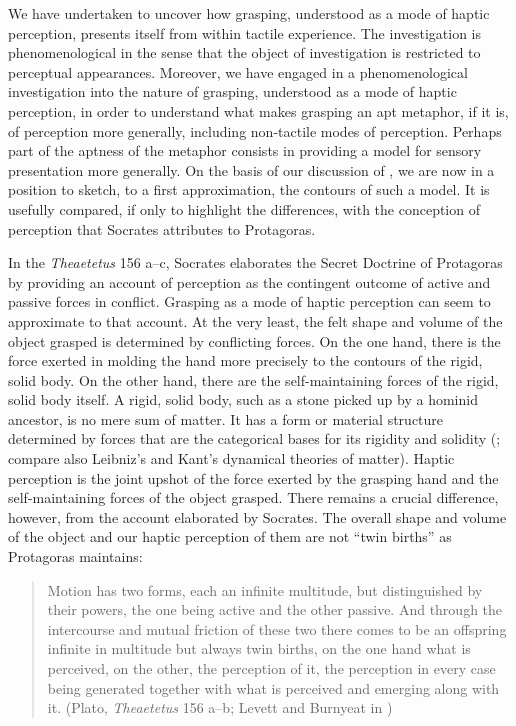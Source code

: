 We have undertaken to uncover how grasping, understood as a mode of haptic perception, presents itself from within tactile experience. The investigation is phenomenological in the sense that the object of investigation is restricted to perceptual appearances. Moreover, we have engaged in a phenomenological investigation into the nature of grasping, understood as a mode of haptic perception, in order to understand what makes grasping an apt metaphor, if it is, of perception more generally, including non-tactile modes of perception. Perhaps part of the aptness of the metaphor consists in providing a model for sensory presentation more generally. On the basis of our discussion of \citet{Lederman:1987fr}, we are now in a position to sketch, to a first approximation, the contours of such a model. It is usefully compared, if only to highlight the differences, with the conception of perception that Socrates attributes to Protagoras.

In the \emph{Theaetetus} 156 a--c, Socrates elaborates the Secret Doctrine of Protagoras by providing an account of perception as the contingent outcome of active and passive forces in conflict. Grasping as a mode of haptic perception can seem to approximate to that account. At the very least, the felt shape and volume of the object grasped is determined by conflicting forces. On the one hand, there is the force exerted in molding the hand more precisely to the contours of the rigid, solid body. On the other hand, there are the self-maintaining forces of the rigid, solid body itself. A rigid, solid body, such as a stone picked up by a hominid ancestor, is no mere sum of matter. It has a form or material structure determined by forces that are the categorical bases for its rigidity and solidity (\citealt{Johnston:2006js}; compare also Leibniz's and Kant's dynamical theories of matter). Haptic perception is the joint upshot of the force exerted by the grasping hand and the self-maintaining forces of the object grasped. There remains a crucial difference, however, from the account elaborated by Socrates. The overall shape and volume of the object and our haptic perception of them are not ``twin births'' as Protagoras maintains: 
\begin{quote}
	Motion has two forms, each an infinite multitude, but distinguished by their powers, the one being active and the other passive. And through the intercourse and mutual friction of these two there comes to be an offspring infinite in multitude but always twin births, on the one hand what is perceived, on the other, the perception of it, the perception in every case being generated together with what is perceived and emerging along with it. (Plato, \emph{Theaetetus} 156 a--b; Levett and Burnyeat in \citealt[173--4]{Cooper:1997fk})
\end{quote}

